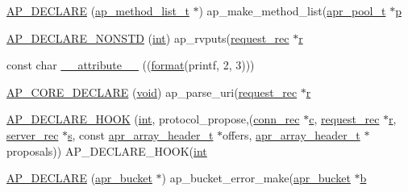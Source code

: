 \begin{DoxyCompactItemize}
\item 
\hyperlink{group__APACHE__CORE__PROTO_ga8dd7ea784cd8c1cdbcb2f8a9d5476e37}{A\+P\+\_\+\+D\+E\+C\+L\+A\+RE} (\hyperlink{structap__method__list__t}{ap\+\_\+method\+\_\+list\+\_\+t} $\ast$) ap\+\_\+make\+\_\+method\+\_\+list(\hyperlink{structapr__pool__t}{apr\+\_\+pool\+\_\+t} $\ast$\hyperlink{group__APACHE__CORE__MPM_ga5cd91701e5c167f2b1a38e70ab57817e}{p}
\item 
\hyperlink{group__APACHE__CORE__PROTO_ga701f77422322b2d476b71ed9e6f6b859}{A\+P\+\_\+\+D\+E\+C\+L\+A\+R\+E\+\_\+\+N\+O\+N\+S\+TD} (\hyperlink{pcre_8txt_a42dfa4ff673c82d8efe7144098fbc198}{int}) ap\+\_\+rvputs(\hyperlink{structrequest__rec}{request\+\_\+rec} $\ast$\hyperlink{pcregrep_8txt_a2e9e9438b26c0bb4425367a7e4f75eb3}{r}
\item 
const char \hyperlink{group__APACHE__CORE__PROTO_ga44bb214856b287cad23bb7a57bbdd7ac}{\+\_\+\+\_\+attribute\+\_\+\+\_\+} ((\hyperlink{group__apr__time_ga6427c3237144d9709aa13825289f0b78}{format}(printf, 2, 3)))
\item 
\hyperlink{group__APACHE__CORE__PROTO_gaff322f7b2924074b4e4a713859093219}{A\+P\+\_\+\+C\+O\+R\+E\+\_\+\+D\+E\+C\+L\+A\+RE} (\hyperlink{group__MOD__ISAPI_gacd6cdbf73df3d9eed42fa493d9b621a6}{void}) ap\+\_\+parse\+\_\+uri(\hyperlink{structrequest__rec}{request\+\_\+rec} $\ast$\hyperlink{pcregrep_8txt_a2e9e9438b26c0bb4425367a7e4f75eb3}{r}
\item 
\hyperlink{group__APACHE__CORE__PROTO_ga6750389239653e3c73ff261c96777ff0}{A\+P\+\_\+\+D\+E\+C\+L\+A\+R\+E\+\_\+\+H\+O\+OK} (\hyperlink{pcre_8txt_a42dfa4ff673c82d8efe7144098fbc198}{int}, protocol\+\_\+propose,(\hyperlink{structconn__rec}{conn\+\_\+rec} $\ast$\hyperlink{pcregrep_8txt_aef720ae5f62fa015619d00171d917416}{c}, \hyperlink{structrequest__rec}{request\+\_\+rec} $\ast$\hyperlink{pcregrep_8txt_a2e9e9438b26c0bb4425367a7e4f75eb3}{r}, \hyperlink{structserver__rec}{server\+\_\+rec} $\ast$\hyperlink{pcretest_8txt_a062597889ba244b72877454b1d3adecf}{s}, const \hyperlink{structapr__array__header__t}{apr\+\_\+array\+\_\+header\+\_\+t} $\ast$offers, \hyperlink{structapr__array__header__t}{apr\+\_\+array\+\_\+header\+\_\+t} $\ast$proposals)) A\+P\+\_\+\+D\+E\+C\+L\+A\+R\+E\+\_\+\+H\+O\+OK(\hyperlink{pcre_8txt_a42dfa4ff673c82d8efe7144098fbc198}{int}
\item 
\hyperlink{group__APACHE__CORE__PROTO_gaef6837c210057cfadec403116b208b11}{A\+P\+\_\+\+D\+E\+C\+L\+A\+RE} (\hyperlink{structapr__bucket}{apr\+\_\+bucket} $\ast$) ap\+\_\+bucket\+\_\+error\+\_\+make(\hyperlink{structapr__bucket}{apr\+\_\+bucket} $\ast$\hyperlink{group__APR__Util__Bucket__Brigades_ga11dc1bdeac74315dbed17465c98879e9}{b}
\end{DoxyCompactItemize}
